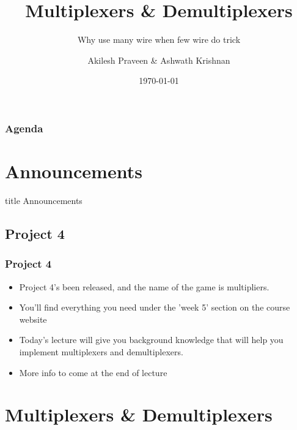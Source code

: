 \documentclass{beamer}
\title{Multiplexers \& Demultiplexers}
\subtitle{Why use many wire when few wire do trick}
\author[A Praveen \& A Krishnan]{Akilesh Praveen \& Ashwath Krishnan}
\institute{UMD}
\date{\today}
\begin{document}
    \begin{frame}
        \titlepage
    \end{frame}
    
    \begin{frame}
        \frametitle{Agenda}
        \tableofcontents
    \end{frame}
    
    \section{Announcements}
    
        \begin{frame}
                \vfill
                \centering
                \begin{beamercolorbox}[sep=8pt,center,shadow=true,rounded=true]{title}
                    Announcements\par%
                \end{beamercolorbox}
                \vfill
             \end{frame}
    
        \subsection{Project 4}
        
            
            
            \begin{frame}
                \frametitle{Project 4}
                \begin{itemize}
                    \item Project 4's been released, and the name of the game is multipliers.
                    \item You'll find everything you need under the 'week 5' section on the course website
                    \item Today's lecture will give you background knowledge that will help you implement multiplexers and demultiplexers.
                    
                    \item More info to come at the end of lecture
                    
                \end{itemize}
            \end{frame}
            
    \section{Multiplexers \& Demultiplexers}
    
\end{document}

